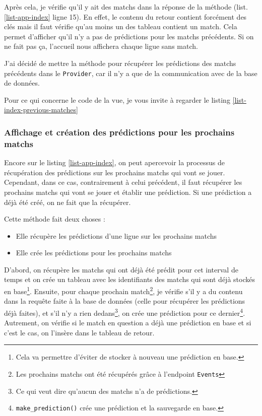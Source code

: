 \documentclass[a4paper,14pt]{extarticle}
\begin{document}
{Après cela, je vérifie qu'il y ait des matchs dans la réponse de la méthode (list. \ref{list-app-index} ligne 15). En effet, le contenu du retour contient forcément des clés mais il faut vérifie qu'au moins un des tableau contient un match. Cela permet d'afficher qu'il n'y a pas de prédictions pour les matchs précédents. Si on ne fait pas ça, l'accueil nous affichera chaque ligue sans match.


J'ai décidé de mettre la méthode pour récupérer les prédictions des matchs précédents dans le \texttt{Provider}, car il n'y a que de la communication avec de la base de données.

Pour ce qui concerne le code de la vue, je vous invite à regarder le listing \ref{list-index-previous-matches}


\subsubsection{Affichage et création des prédictions pour les prochains matchs}

Encore sur le listing \ref{list-app-index}, on peut apercevoir la processus de récupération des prédictions sur les prochains matchs qui vont se jouer. Cependant, dans ce cas, contrairement à celui précédent, il faut récupérer les prochains matchs qui vont se jouer et établir une prédiction. Si une prédiction a déjà été créé, on ne fait que la récupérer.


Cette méthode fait deux choses :
\begin{itemize}
    \item Elle récupère les prédictions d'une ligue sur les prochains matchs
    \item Elle crée les prédictions pour les prochains matchs
\end{itemize}

D'abord, on récupère les matchs qui ont déjà été prédit pour cet interval de temps et on crée un tableau avec les identifiants des matchs qui sont déjà stockés en base\footnote{Cela va permettre d'éviter de stocker à nouveau une prédiction en base.}. Ensuite, pour chaque prochain match\footnote{Les prochains matchs ont été récupérés grâce à l'endpoint \texttt{Events}}, je vérifie s'il y a du contenu dans la requête faite à la base de données (celle pour récupérer les prédictions déjà faites), et s'il n'y a rien dedans\footnote{Ce qui veut dire qu'aucun des matchs n'a de prédictions.}, on crée une prédiction pour ce dernier\footnote{\texttt{make\_prediction()} crée une prédiction et la sauvegarde en base.}. Autrement, on vérifie si le match en question a déjà une prédiction en base et si c'est le cas, on l'insère dans le tableau de retour.

}
\end{document}
